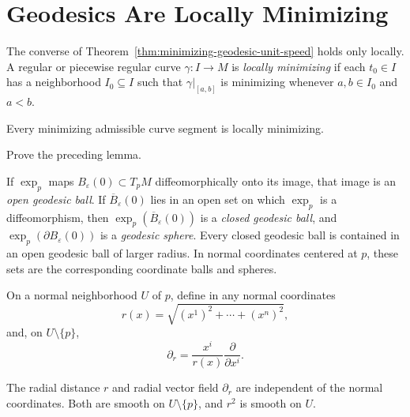 \section{Geodesics Are Locally Minimizing}

The converse of Theorem~\ref{thm:minimizing-geodesic-unit-speed} holds only
locally.  A regular or piecewise regular curve $\gamma:I\to M$ is
\emph{locally minimizing} if each $t_0\in I$ has a neighborhood $I_0\subseteq
I$ such that $\gamma|_{[a,b]}$ is minimizing whenever $a,b\in I_0$ and
$a<b$.

\begin{lemma}
\label{lem:minimizing-curves-locally-minimizing}

Every minimizing admissible curve segment is locally minimizing.
\end{lemma}

\begin{exercise}
\label{exer:prove-minimizing-lemma}

Prove the preceding lemma.
\end{exercise}

If $\exp_p$ maps $B_\varepsilon(0)\subset T_pM$ diffeomorphically onto its
image, that image is an \emph{open geodesic ball}.  If
$\overline B_\varepsilon(0)$ lies in an open set on which $\exp_p$ is a
diffeomorphism, then $\exp_p(\overline B_\varepsilon(0))$ is a
\emph{closed geodesic ball}, and $\exp_p(\partial B_\varepsilon(0))$ is a
\emph{geodesic sphere}.  Every closed geodesic ball is contained in an open
geodesic ball of larger radius.  In normal coordinates centered at $p$, these
sets are the corresponding coordinate balls and spheres.

On a normal neighborhood $U$ of $p$, define in any normal coordinates
\begin{equation}
r(x) = \sqrt{(x^1)^2 + \cdots + (x^n)^2}, \tag{6.4}
\end{equation}
and, on $U\setminus\{p\}$,
\begin{equation}
\partial_r = \frac{x^i}{r(x)} \frac{\partial}{\partial x^i}. \tag{6.5}
\end{equation}

\begin{lemma}
\label{lem:radial-distance-well-defined}

The radial distance $r$ and radial vector field $\partial_r$ are independent
of the normal coordinates.  Both are smooth on $U\setminus\{p\}$, and $r^2$
is smooth on $U$.
\end{lemma}


